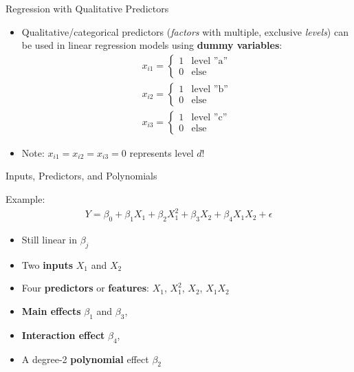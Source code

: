 \documentclass[ignorenonframetext,xcolor=x11names]{beamer}
\begin{document}
\begin{frame}{Regression with Qualitative Predictors}
\begin{itemize}
  \item Qualitative/categorical predictors (\emph{factors} with multiple, exclusive \emph{levels}) can be used in linear regression models using \textbf{dummy variables}:
\begin{align*}
x_{i1} = \begin{cases}
1 & \text{level ''a''} \\
0 & \text{else}
\end{cases} \\
x_{i2} = \begin{cases}
1 & \text{level ''b''} \\
0 & \text{else}
\end{cases} \\
x_{i3} = \begin{cases}
1 & \text{level ''c''} \\
0 & \text{else}
\end{cases}
\end{align*}
\item Note: $x_{i1} = x_{i2} = x_{i3} = 0$ represents level $d$!
\end{itemize}
\end{frame}

\begin{frame}{Inputs, Predictors, and Polynomials}

Example:
\begin{align*}
Y = \beta_0 + \beta_1 X_1 + \beta_2 X_1^2 + \beta_3 X_2 + \beta_4 X_1 X_2 + \epsilon
\end{align*}
\begin{itemize}
  \item Still linear in $\beta_j$
  \item Two \textbf{inputs} $X_1$ and $X_2$
  \item Four \textbf{predictors} or \textbf{features}: $X_1$, $X_1^2$, $X_2$, $X_1 X_2$
  \item \textbf{Main effects} $\beta_1$ and $\beta_3$, 
  \item \textbf{Interaction effect} $\beta_4$, 
  \item A degree-2 \textbf{polynomial} effect $\beta_2$
\end{itemize}
\end{frame}
\end{document}
